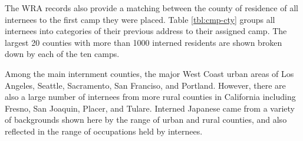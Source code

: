 The WRA records also provide a matching between the county of residence of all internees to the first camp they were placed.
Table \ref{tbl:cmp-cty} groups all internees into categories of their previous address to their assigned camp.
The largest 20 counties with more than 1000 interned residents are shown broken down by each of the ten camps.

Among the main internment counties, the major West Coast urban areas of Los Angeles, Seattle, Sacramento, San Franciso, and Portland.
However, there are also a large number of internees from more rural counties in California including Fresno, San Joaquin, Placer, and Tulare.
Interned Japanese came from a variety of backgrounds shown here by the range of urban and rural counties,
and also reflected in the range of occupations held by internees.
